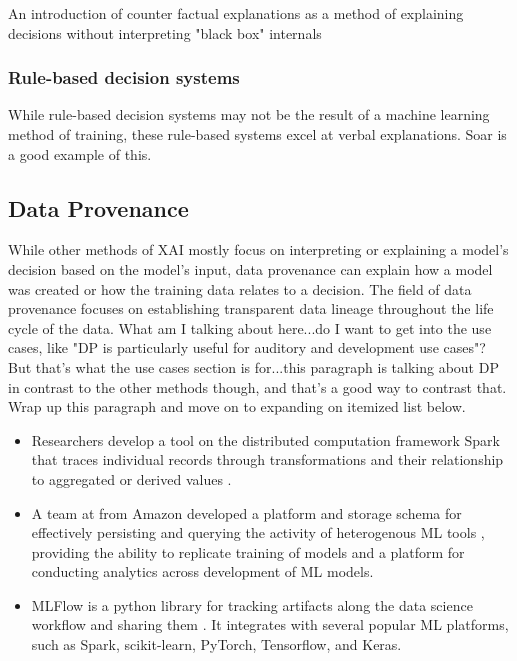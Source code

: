 An introduction of counter factual explanations as a method of explaining decisions without interpreting "black box" internals \cite{DBLP:journals/corr/abs-1711-00399}

\subsubsection{Rule-based decision systems}

While rule-based decision systems may not be the result of a machine learning method of training, these rule-based systems excel at verbal explanations.  Soar is a good example of this.

\subsection{Data Provenance}

While other methods of XAI mostly focus on interpreting or explaining a model's decision based on the model's input, data provenance can explain how a model was created or how the training data relates to a decision.  The field of data provenance focuses on establishing transparent data lineage throughout the life cycle of the data.  What am I talking about here...do I want to get into the use cases, like "DP is particularly useful for auditory and development use cases"?  But that's what the use cases section is for...this paragraph is talking about DP in contrast to the other methods though, and that's a good way to contrast that.  Wrap up this paragraph and move on to expanding on itemized list below.

\begin{itemize}
    \item Researchers develop a tool on the distributed computation framework Spark that traces individual records through transformations and their relationship to aggregated or derived values  \cite{Interlandi2017}.
    \item A team at from Amazon developed a platform and storage schema for effectively persisting and querying the activity of heterogenous ML tools \cite{Schelter2017}, providing the ability to replicate training of models and a platform for conducting analytics across development of ML models.
    \item MLFlow is a python library for tracking artifacts along the data science workflow and sharing them \cite{Zaharia2018}.  It integrates with several popular ML platforms, such as Spark, scikit-learn, PyTorch, Tensorflow, and Keras.
\end{itemize}

